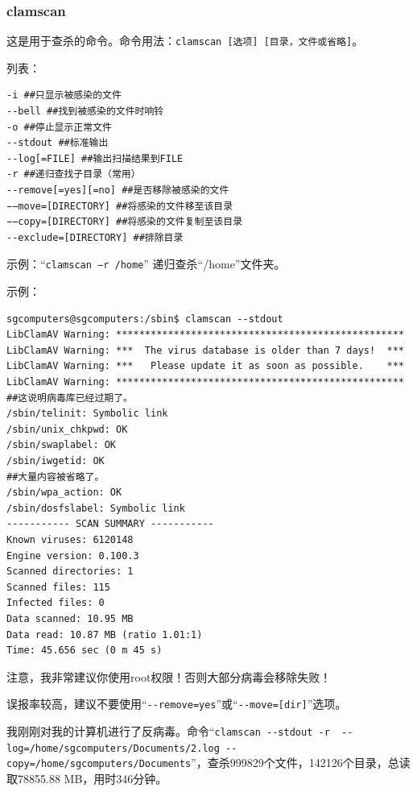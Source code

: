 \subsubsection{clamscan}
\cite{mancs}\par
这是用于查杀的命令。命令用法：\verb|clamscan [选项] [目录，文件或省略]|。\par
[选项]列表：\par
\begin{verbatim}
-i ##只显示被感染的文件
--bell ##找到被感染的文件时响铃
-o ##停止显示正常文件
--stdout ##标准输出
--log[=FILE] ##输出扫描结果到FILE
-r ##递归查找子目录（常用）
--remove[=yes][=no] ##是否移除被感染的文件
−−move=[DIRECTORY] ##将感染的文件移至该目录
−−copy=[DIRECTORY] ##将感染的文件复制至该目录
--exclude=[DIRECTORY] ##排除目录
\end{verbatim} \par
示例：“\verb|clamscan −r /home|”  递归查杀“/home”文件夹。\par
示例：
\begin{verbatim}
sgcomputers@sgcomputers:/sbin$ clamscan --stdout
LibClamAV Warning: **************************************************
LibClamAV Warning: ***  The virus database is older than 7 days!  ***
LibClamAV Warning: ***   Please update it as soon as possible.    ***
LibClamAV Warning: **************************************************
##这说明病毒库已经过期了。
/sbin/telinit: Symbolic link
/sbin/unix_chkpwd: OK
/sbin/swaplabel: OK
/sbin/iwgetid: OK
##大量内容被省略了。
/sbin/wpa_action: OK
/sbin/dosfslabel: Symbolic link
----------- SCAN SUMMARY -----------
Known viruses: 6120148
Engine version: 0.100.3
Scanned directories: 1
Scanned files: 115
Infected files: 0
Data scanned: 10.95 MB
Data read: 10.87 MB (ratio 1.01:1)
Time: 45.656 sec (0 m 45 s)
\end{verbatim} \par
{\color{red}注意，我非常建议你使用root权限！否则大部分病毒会移除失败！\par 误报率较高，建议不要使用“\verb|--remove=yes|”或“\verb|--move=[dir]|”选项。}\par
我刚刚对我的计算机进行了反病毒。命令“\verb|clamscan --stdout -r  --log=/home/sgcomputers/Documents/2.log --copy=/home/sgcomputers/Documents|”，查杀999829个文件，142126个目录，总读取78855.88 MB，用时346分钟。
